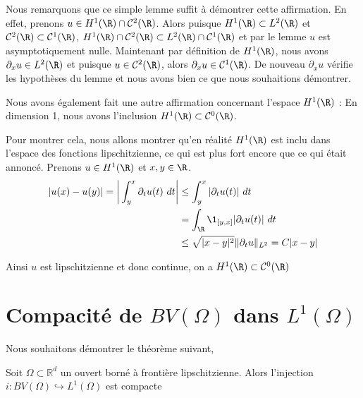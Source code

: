Nous remarquons que ce simple lemme suffit à démontrer cette affirmation. En effet, prenons $u \in H^1(\R)\cap\mathcal{C}^2(\R)$.
Alors puisque $H^1(\R) \subset L^2(\R)$ et $\mathcal{C}^2(\R) \subset \mathcal{C}^1(\R)$, $H^1(\R)\cap\mathcal{C}^2(\R) \subset L^2(\R) \cap \mathcal{C}^1(\R)$ et par le lemme $u$ est asymptotiquement nulle.
Maintenant par définition de $H^1(\R)$, nous avons $\partial_x u \in L^2(\R)$ et puisque $u \in \mathcal{C}^2(\R)$, alors $\partial_x u \in \mathcal{C}^1(\R)$. De nouveau $\partial_x u$ vérifie les hypothèses du lemme et nous avons bien ce que nous souhaitions démontrer.

\vspace{1em}

Nous avons également fait une autre affirmation concernant l'espace $H^1(\R)$ : En dimension 1, nous avons l'inclusion $H^1(\R) \subset \mathcal{C}^0(\R)$.

Pour montrer cela, nous allons montrer qu'en réalité $H^1(\R)$ est inclu dans l'espace des fonctions lipschitzienne, ce qui est plus fort encore que ce qui était annoncé.
Prenons $u \in H^1(\R)$ et $x,y \in \R$.
\begin{equation*}
\begin{split}
    |u(x) - u(y)| = \bigg| \int_y^x \partial_t u(t) \ dt \bigg| &\leq \int_y^x |\partial_t u(t)| \ dt \\
    &= \int_{\R} \1_{[y,x]} |\partial_t u(t)| \ dt \\
    &\leq \sqrt{|x - y|^2} \| \partial_t u \|_{L^2} = C |x - y|
\end{split}
\end{equation*}

Ainsi $u$ est lipschitzienne et donc continue, on a $H^1(\R) \subset \mathcal{C}^0(\R)$

\chapter{Compacité de $BV(\Omega)$ dans $L^1(\Omega)$}

Nous souhaitons démontrer le théorème suivant, 

\begin{theorembox}
\begin{theorem}
    Soit $\Omega \subset \mathbb{R}^d$ un ouvert borné à frontière lipschitzienne.
    Alors l'injection $i : BV(\Omega) \hookrightarrow L^1(\Omega)$ est compacte
\end{theorem}
\end{theorembox}

